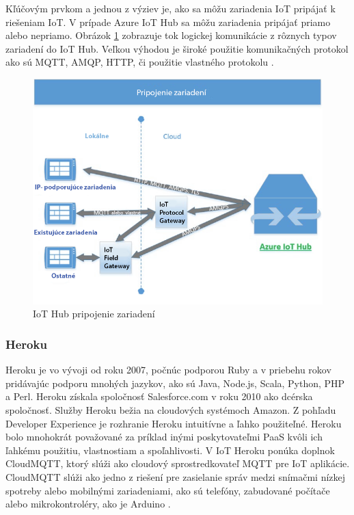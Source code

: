\documentclass[twoside]{ctuthesis}
\theoremstyle{plain}
\theoremstyle{definition}
\theoremstyle{note}
\begin{document}
Kľúčovým prvkom a jednou z výziev je, ako sa môžu zariadenia IoT pripájať k riešeniam IoT. V prípade Azure IoT Hub sa môžu zariadenia pripájať priamo alebo nepriamo. Obrázok \ref{fig:connectivity} zobrazuje tok logickej komunikácie z rôznych typov zariadení do IoT Hub. Veľkou výhodou je široké použitie komunikačných protokol ako sú MQTT, AMQP, HTTP, či použitie vlastného protokolu  \cite{azureHub} \cite{IoTHub}.

\begin{figure}[H]
\includegraphics[width=\linewidth]{IoTHub3.png}
\caption{IoT Hub pripojenie zariadení \cite{azureHub}}
\label{fig:connectivity}
\end{figure}



\subsubsection{Heroku}
Heroku je vo vývoji od roku 2007, počnúc podporou Ruby a v priebehu rokov pridávajúc podporu mnohých jazykov, ako sú Java, Node.js, Scala, Python, PHP a Perl. Heroku získala spoločnosť Salesforce.com v roku 2010 ako dcérska spoločnosť. Služby Heroku bežia na cloudových systémoch Amazon. Z pohľadu Developer Experience je rozhranie Heroku intuitívne a ľahko použiteľné. Heroku bolo mnohokrát považované za príklad inými poskytovateľmi PaaS kvôli ich ľahkému použitiu, vlastnostiam a spoľahlivosti. V IoT Heroku ponúka doplnok CloudMQTT, ktorý slúži ako cloudový sprostredkovateľ MQTT pre IoT aplikácie. CloudMQTT slúži ako jedno z riešení pre zasielanie správ medzi snímačmi nízkej spotreby alebo mobilnými zariadeniami, ako sú telefóny, zabudované počítače alebo mikrokontroléry, ako je Arduino \cite{iotcloud} \cite{heroku}.
\end{document}
